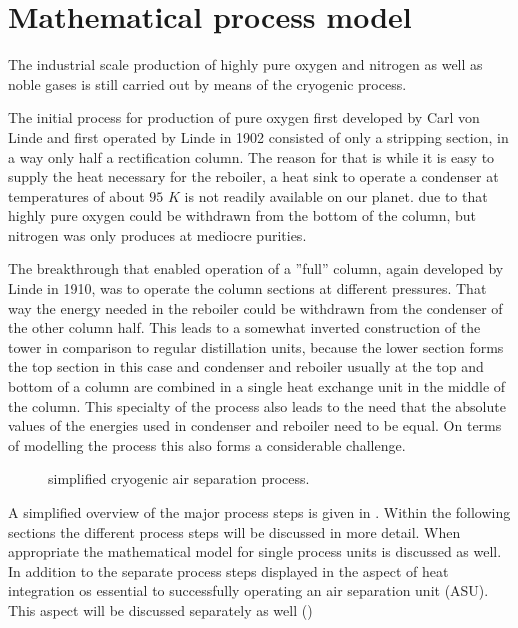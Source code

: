 \chapter{Mathematical process model}
\label{chp:MathModel}


    The industrial scale production of highly pure oxygen and nitrogen as well as noble
    gases is still carried out by means of the cryogenic process.

    The initial process for production of pure oxygen first developed by Carl von Linde
    and first operated by Linde in 1902 \cite{Barron.1985} consisted of only
    a stripping section, in a way only half a rectification column. The reason for that is
    while it is easy to supply the heat necessary for the reboiler, a heat sink to operate
    a condenser at temperatures of about $95$ $K$ is not readily available on our planet.
    due to that highly pure oxygen could be withdrawn from the bottom of the column, but
    nitrogen was only produces at mediocre purities.

    The breakthrough that enabled operation of a ''full'' column, again developed by Linde in 1910,  was to operate the
    column sections at different pressures. That way the energy needed in the reboiler
    could be withdrawn from the condenser of the other column half. This leads to a
    somewhat inverted construction of the tower in comparison to regular distillation
    units, because the lower section forms the top section in this case and condenser
    and reboiler usually at the top and bottom of a column are combined in a single
    heat exchange unit in the middle of the column. This specialty of the process also
    leads to the need that the absolute values of the energies used in condenser and
    reboiler need to be equal. On terms of modelling the process this also forms a
    considerable challenge.

    \begin{figure}
        
        \caption{simplified cryogenic air separation process.}
        \label{fig:asu_simple}
    \end{figure}

    A simplified overview of the major process steps is given in .
    Within the following sections the different process steps will be discussed in more detail.
    When appropriate the mathematical model for single process units is discussed as well.
    In addition to the separate process steps displayed in  the aspect
    of heat integration os essential to successfully operating an air separation unit (ASU).
    This aspect will be discussed separately as well ()

